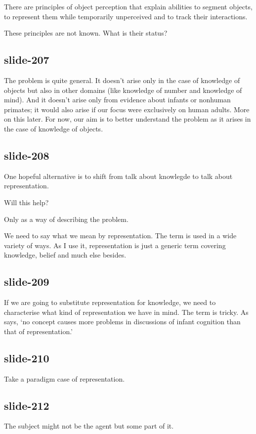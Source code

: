 \documentclass[12pt,\papersize]{extarticle}
\begin{document}
There are principles of object perception that explain abilities to segment objects, to represent them while temporarily unperceived and to track their interactions.
 
These principles are not known.  What is their status?
 
\subsection{slide-207}
The problem is quite general.
It doesn't arise only in the case of knowledge of objects but also in other domains 
(like knowledge of number and knowledge of mind).
And it doesn't arise only from evidence about infants or nonhuman primates; it would also 
arise if our focus were exclusively on human adults.
More on this later.
For now, our aim is to better understand the problem as it arises in the case of knowledge of objects.
 
\subsection{slide-208}
One hopeful alternative is to shift from talk about knowlegde to talk about representation.
 
Will this help?
 
Only as a way of describing the problem.
 
We need to say what we mean by representation.
The term is used in a wide variety of ways.
As I use it, representation is just a generic term covering knowledge, belief and much else besides.
 
\subsection{slide-209}
If we are going to substitute representation for knowledge, 
we need to characterise what kind of representation we have in mind.
The term is tricky.
As \citet{Haith:1998aq} says, ‘no concept causes more problems in discussions of infant cognition than that of representation.’
 
\subsection{slide-210}
Take a paradigm case of representation.
 
\subsection{slide-212}
The subject might not be the agent but some part of it.
 
\end{document}
